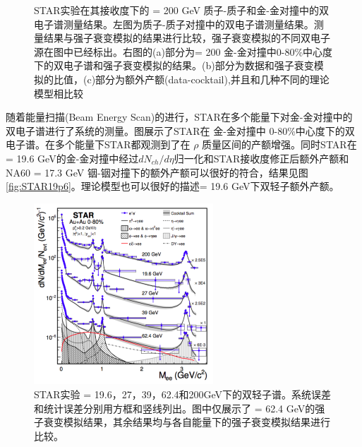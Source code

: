 \begin{figure}[htb]
\begin{subfigure}[b]{0.43\textwidth}
        \caption{}
        \label{fig:STARAuAu}
    \end{subfigure}
    \caption[STAR实验 \sNN = 200 GeV 质子-质子和金-金对撞中的双电子谱测量结果]{STAR实验在其接收度下的 \sNN = 200 GeV 质子-质子和金-金对撞中的双电子谱测量结果。左图为质子-质子对撞中的双电子谱测量结果。测量结果与强子衰变模拟的结果进行比较，强子衰变模拟的不同双电子源在图中已经标出。右图的(a)部分为\sNN = 200 金-金对撞中0-80\%中心度下的双电子谱和强子衰变模拟的结果。(b)部分为数据和强子衰变模拟的比值，(c)部分为额外产额(data-cocktail),并且和几种不同的理论模型相比较}
       \label{fig:STARDiElectron}
\end{figure}

随着能量扫描(Beam Energy Scan)的进行，STAR在多个能量下对金-金对撞中的双电子谱进行了系统的测量。图展示了STAR在 \egyfive 金-金对撞中 0-80\%中心度下的双电子谱。在多个能量下STAR都观测到了在 $\rho$ 质量区间的产额增强。同时STAR在 \sNN = 19.6 GeV的金-金对撞中经过$dN_{ch}/d\eta$归一化和STAR接收度修正后额外产额和 NA60 \sNN = 17.3 GeV 铟-铟对撞下的额外产额可以很好的符合，结果见图 \ref{fig:STAR19p6}。理论模型也可以很好的描述\sNN = 19.6 GeV下双轻子额外产额。

\begin{figure}[htb]
    \begin{center}
    \includegraphics[width=0.6\textwidth,clip]{figures/Chapter1/STARBES.png}
    \end{center}
    \caption[STAR实验 \egyfive 下的双轻子谱]{STAR实验 \sNN = 19.6，27，39，62.4和200GeV下的双轻子谱。系统误差和统计误差分别用方框和竖线列出。图中仅展示了 \sNN = 62.4 GeV的强子衰变模拟结果，其余结果均与各自能量下的强子衰变模拟结果进行比较。}
    \label{fig:STARBES}
\end{figure}

